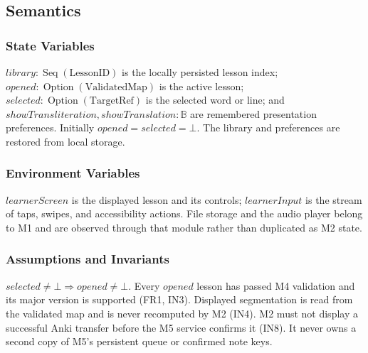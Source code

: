 \documentclass[12pt, titlepage]{article}
\begin{document}
\subsection{Semantics}
\subsubsection{State Variables}
$library:\operatorname{Seq}(\mathrm{LessonID})$ is the locally
persisted lesson index; $opened:
\operatorname{Option}(\mathrm{ValidatedMap})$ is the active
lesson; $selected:\operatorname{Option}(\mathrm{TargetRef})$
is the selected word or line; and
$showTransliteration,showTranslation:\mathbb{B}$ are remembered
presentation preferences. Initially $opened=selected=\bot$.
The library and preferences are restored from local storage.

\subsubsection{Environment Variables}
$learnerScreen$ is the displayed lesson and its controls;
$learnerInput$ is the stream of taps, swipes, and accessibility
actions. File storage and the audio player belong to M1 and are
observed through that module rather than duplicated as M2 state.

\subsubsection{Assumptions and Invariants}
$selected\neq\bot\Rightarrow opened\neq\bot$.
Every $opened$ lesson has passed M4 validation and its major
version is supported (FR1, IN3). Displayed segmentation is read
from the validated map and is never recomputed by M2 (IN4).
M2 must not display a successful Anki transfer before the M5
service confirms it (IN8). It never owns a second copy of M5's
persistent queue or confirmed note keys.
\end{document}
